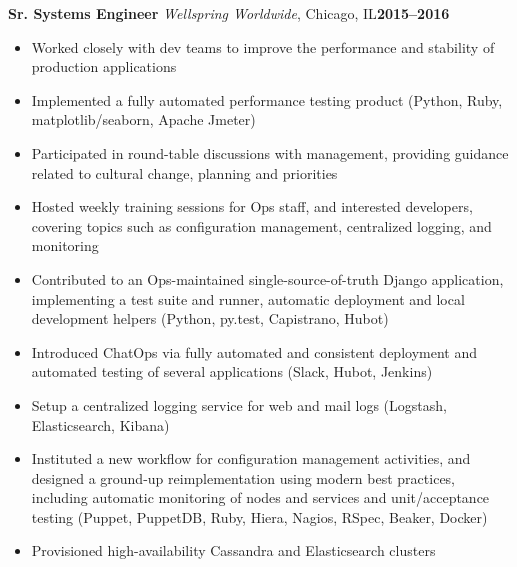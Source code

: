\documentclass[11pt,letterpaper]{article}
\newcommand{\cventry}[5]{%
{\bfseries{#2}} {\small{\textit{#3}, #4}}\hfill {\small\bfseries{#1}}
\begin{adjustwidth}{1em}{2em}{\raggedright{#5}}\end{adjustwidth}
}
\begin{document}
\cventry{2015--2016}{Sr. Systems Engineer}{Wellspring Worldwide}{Chicago, IL}{%
{}
\begin{small}
\begin{itemize}
\item Worked closely with dev teams to improve the performance and stability of
      production applications
\item Implemented a fully automated performance testing product (Python, Ruby,
      matplotlib/seaborn, Apache Jmeter)
\item Participated in round-table discussions with management, providing
      guidance related to cultural change, planning and priorities
\item Hosted weekly training sessions for Ops staff, and interested
      developers, covering topics such as configuration management, centralized
      logging, and monitoring
\item Contributed to an Ops-maintained single-source-of-truth Django application,
      implementing a test suite and runner, automatic deployment and local
      development helpers (Python, py.test, Capistrano, Hubot)
\item Introduced ChatOps via fully automated and consistent deployment and
      automated testing of several applications (Slack, Hubot, Jenkins)
\item Setup a centralized logging service for web and mail logs (Logstash,
      Elasticsearch, Kibana)
\item Instituted a new workflow for configuration management activities, and
      designed a ground-up reimplementation using modern best
      practices, including automatic monitoring of nodes and services and
      unit/acceptance testing (Puppet, PuppetDB, Ruby, Hiera, Nagios, RSpec,
      Beaker, Docker)
\item Provisioned high-availability Cassandra and Elasticsearch clusters
\end{itemize}
\end{small}
}
\end{document}
